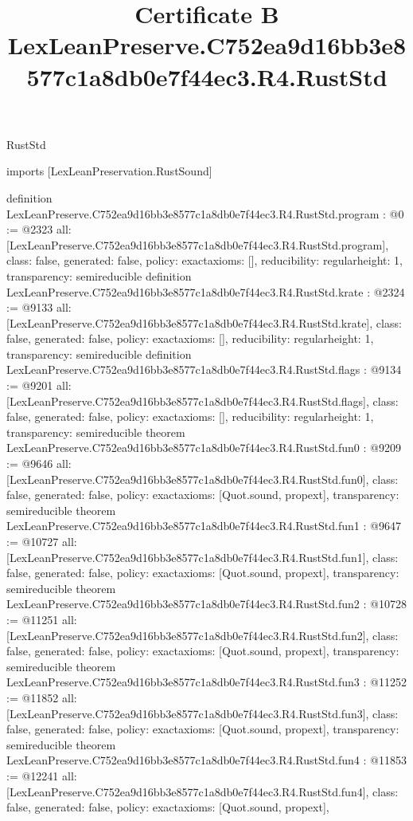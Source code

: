 \begin{lexlean}{RustStd}
\title{Certificate B LexLeanPreserve.C752ea9d16bb3e8577c1a8db0e7f44ec3.R4.RustStd}
\begin{coremodule}
imports [LexLeanPreservation.RustSound]

definition LexLeanPreserve.C752ea9d16bb3e8577c1a8db0e7f44ec3.R4.RustStd.program : @0 := @2323 {
  all: [LexLeanPreserve.C752ea9d16bb3e8577c1a8db0e7f44ec3.R4.RustStd.program],
  class: false,
  generated: false,
  policy: exact{axioms: []},
  reducibility: regular{height: 1},
  transparency: semireducible
}
definition LexLeanPreserve.C752ea9d16bb3e8577c1a8db0e7f44ec3.R4.RustStd.krate : @2324 := @9133 {
  all: [LexLeanPreserve.C752ea9d16bb3e8577c1a8db0e7f44ec3.R4.RustStd.krate],
  class: false,
  generated: false,
  policy: exact{axioms: []},
  reducibility: regular{height: 1},
  transparency: semireducible
}
definition LexLeanPreserve.C752ea9d16bb3e8577c1a8db0e7f44ec3.R4.RustStd.flags : @9134 := @9201 {
  all: [LexLeanPreserve.C752ea9d16bb3e8577c1a8db0e7f44ec3.R4.RustStd.flags],
  class: false,
  generated: false,
  policy: exact{axioms: []},
  reducibility: regular{height: 1},
  transparency: semireducible
}
theorem LexLeanPreserve.C752ea9d16bb3e8577c1a8db0e7f44ec3.R4.RustStd.fun0 : @9209 := @9646 {
  all: [LexLeanPreserve.C752ea9d16bb3e8577c1a8db0e7f44ec3.R4.RustStd.fun0],
  class: false,
  generated: false,
  policy: exact{axioms: [Quot.sound, propext]},
  transparency: semireducible
}
theorem LexLeanPreserve.C752ea9d16bb3e8577c1a8db0e7f44ec3.R4.RustStd.fun1 : @9647 := @10727 {
  all: [LexLeanPreserve.C752ea9d16bb3e8577c1a8db0e7f44ec3.R4.RustStd.fun1],
  class: false,
  generated: false,
  policy: exact{axioms: [Quot.sound, propext]},
  transparency: semireducible
}
theorem LexLeanPreserve.C752ea9d16bb3e8577c1a8db0e7f44ec3.R4.RustStd.fun2 : @10728 := @11251 {
  all: [LexLeanPreserve.C752ea9d16bb3e8577c1a8db0e7f44ec3.R4.RustStd.fun2],
  class: false,
  generated: false,
  policy: exact{axioms: [Quot.sound, propext]},
  transparency: semireducible
}
theorem LexLeanPreserve.C752ea9d16bb3e8577c1a8db0e7f44ec3.R4.RustStd.fun3 : @11252 := @11852 {
  all: [LexLeanPreserve.C752ea9d16bb3e8577c1a8db0e7f44ec3.R4.RustStd.fun3],
  class: false,
  generated: false,
  policy: exact{axioms: [Quot.sound, propext]},
  transparency: semireducible
}
theorem LexLeanPreserve.C752ea9d16bb3e8577c1a8db0e7f44ec3.R4.RustStd.fun4 : @11853 := @12241 {
  all: [LexLeanPreserve.C752ea9d16bb3e8577c1a8db0e7f44ec3.R4.RustStd.fun4],
  class: false,
  generated: false,
  policy: exact{axioms: [Quot.sound, propext]},
}
\end{coremodule}
\end{lexlean}
